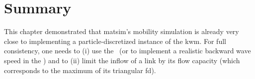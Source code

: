 \section{\label{sec:kinematicwaves-summary}Summary}
This chapter demonstrated that \gls{matsim}'s mobility simulation is already
very close to implementing a particle-discretized instance of the
\gls{kwm}. For full consistency, one needs to (i) use the \DOUBLEQUEUESIM\ 
(or to implement a realistic backward wave speed in the \SINGLEQUEUESIM)
and to (ii) limit the inflow of a link by its flow capacity (which
corresponds to the maximum of its triangular \gls{fd}). 
% 
% 

